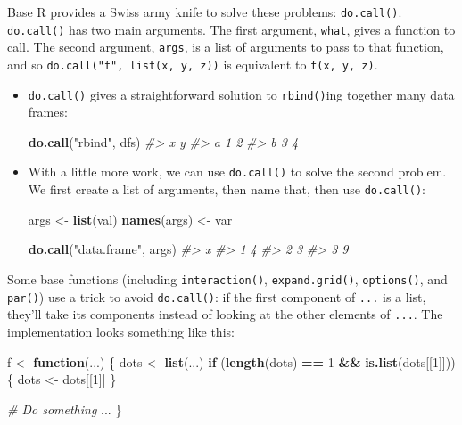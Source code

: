 \documentclass[]{book}
\makeatletter
\newenvironment{Shaded}{\begin{snugshade}}{\end{snugshade}}
\newcommand{\CommentTok}[1]{\textcolor[rgb]{0.37,0.37,0.37}{\textit{#1}}}
\newcommand{\ControlFlowTok}[1]{\textcolor[rgb]{0.27,0.27,0.27}{\textbf{#1}}}
\newcommand{\DecValTok}[1]{\textcolor[rgb]{0.06,0.06,0.06}{#1}}
\newcommand{\KeywordTok}[1]{\textcolor[rgb]{0.27,0.27,0.27}{\textbf{#1}}}
\newcommand{\NormalTok}[1]{#1}
\newcommand{\OperatorTok}[1]{\textcolor[rgb]{0.43,0.43,0.43}{\textbf{#1}}}
\newcommand{\StringTok}[1]{\textcolor[rgb]{0.5,0.5,0.5}{#1}}
\newcommand{\indexc}[1]{\index{#1@\texttt{#1}}}
\makeatother
\begin{document}
\indexc{do.call()}

Base R provides a Swiss army knife to solve these problems: \texttt{do.call()}. \texttt{do.call()} has two main arguments. The first argument, \texttt{what}, gives a function to call. The second argument, \texttt{args}, is a list of arguments to pass to that function, and so \texttt{do.call("f",\ list(x,\ y,\ z))} is equivalent to \texttt{f(x,\ y,\ z)}.

\begin{itemize}
\item
  \texttt{do.call()} gives a straightforward solution to \texttt{rbind()}ing together many
  data frames:

\begin{Shaded}
\begin{Highlighting}[]
\KeywordTok{do.call}\NormalTok{(}\StringTok{"rbind"}\NormalTok{, dfs)}
\CommentTok{#>   x y}
\CommentTok{#> a 1 2}
\CommentTok{#> b 3 4}
\end{Highlighting}
\end{Shaded}
\item
  With a little more work, we can use \texttt{do.call()} to solve the second problem.
  We first create a list of arguments, then name that, then use \texttt{do.call()}:

\begin{Shaded}
\begin{Highlighting}[]
\NormalTok{args <-}\StringTok{ }\KeywordTok{list}\NormalTok{(val)}
\KeywordTok{names}\NormalTok{(args) <-}\StringTok{ }\NormalTok{var}

\KeywordTok{do.call}\NormalTok{(}\StringTok{"data.frame"}\NormalTok{, args)}
\CommentTok{#>   x}
\CommentTok{#> 1 4}
\CommentTok{#> 2 3}
\CommentTok{#> 3 9}
\end{Highlighting}
\end{Shaded}
\end{itemize}

Some base functions (including \texttt{interaction()}, \texttt{expand.grid()}, \texttt{options()}, and \texttt{par()}) use a trick to avoid \texttt{do.call()}: if the first component of \texttt{...} is a list, they'll take its components instead of looking at the other elements of \texttt{...}. The implementation looks something like this:

\begin{Shaded}
\begin{Highlighting}[]
\NormalTok{f <-}\StringTok{ }\ControlFlowTok{function}\NormalTok{(...) \{}
\NormalTok{  dots <-}\StringTok{ }\KeywordTok{list}\NormalTok{(...)}
  \ControlFlowTok{if}\NormalTok{ (}\KeywordTok{length}\NormalTok{(dots) }\OperatorTok{==}\StringTok{ }\DecValTok{1} \OperatorTok{&&}\StringTok{ }\KeywordTok{is.list}\NormalTok{(dots[[}\DecValTok{1}\NormalTok{]])) \{}
\NormalTok{    dots <-}\StringTok{ }\NormalTok{dots[[}\DecValTok{1}\NormalTok{]]}
\NormalTok{  \}}
  
  \CommentTok{# Do something}
\NormalTok{  ...}
\NormalTok{\}}
\end{Highlighting}
\end{Shaded}
\end{document}
